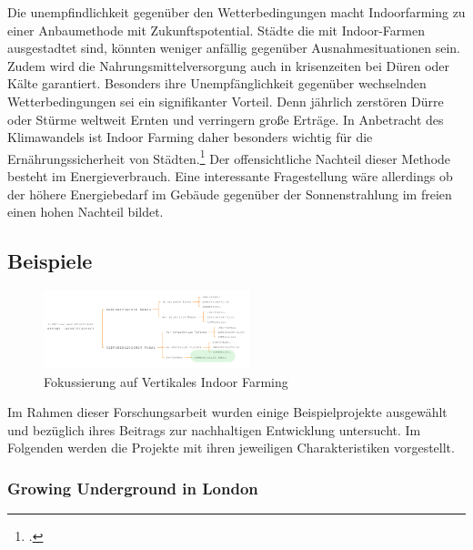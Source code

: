 \documentclass{scrartcl}
\begin{document}
Die unempfindlichkeit gegenüber den Wetterbedingungen macht Indoorfarming zu einer Anbaumethode mit Zukunftspotential. Städte die mit Indoor-Farmen ausgestadtet sind, könnten weniger anfällig gegenüber Ausnahmesituationen sein. Zudem wird die Nahrungsmittelversorgung auch in krisenzeiten bei Düren oder Kälte garantiert. Besonders ihre Unempfänglichkeit gegenüber wechselnden Wetterbedingungen sei ein signifikanter Vorteil. Denn jährlich zerstören Dürre oder Stürme weltweit Ernten und verringern große Erträge. In Anbetracht des Klimawandels ist Indoor Farming daher besonders wichtig für die Ernährungssicherheit von Städten.\footcite[Vgl.][S.27]{Al-Kodmany2018TheCity} Der offensichtliche Nachteil dieser Methode besteht im Energieverbrauch. Eine interessante Fragestellung wäre allerdings ob der höhere Energiebedarf im Gebäude gegenüber der Sonnenstrahlung im freien einen hohen Nachteil bildet. 

\subsection{Beispiele}



\begin{figure}[htbp]
\centering
\includegraphics[width=6cm]{image_folder/moglicheEinteilungena_s32.png}
\caption{Fokussierung auf Vertikales Indoor Farming}
\label{fig:Fokussierung auf Vertikales Indoor Farming}
\end{figure}

Im Rahmen dieser Forschungsarbeit wurden einige Beispielprojekte ausgewählt und bezüglich ihres Beitrags zur nachhaltigen Entwicklung untersucht. Im Folgenden werden die Projekte mit ihren jeweiligen Charakteristiken vorgestellt.

\subsubsection{Growing Underground in London}
\end{document}
